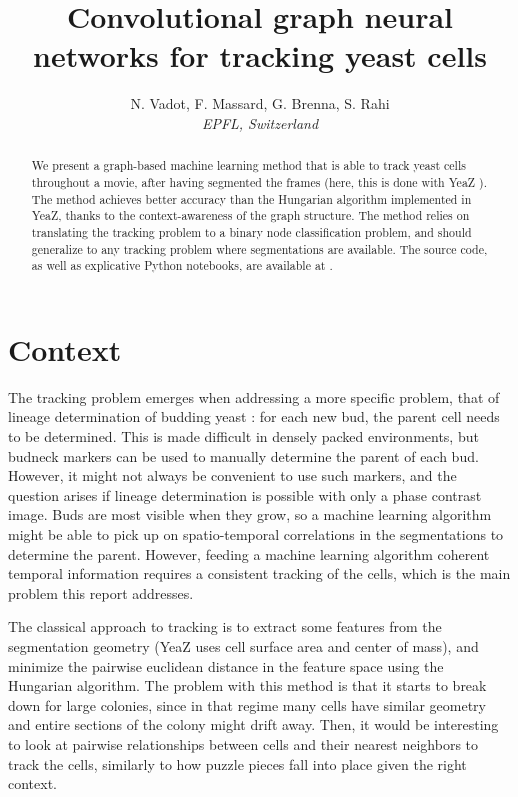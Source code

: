 \documentclass[10pt,conference,compsocconf,a4paper]{IEEEtran}
\begin{document}
\title{Convolutional graph neural networks for tracking yeast cells}

\author{
	N. Vadot, F. Massard, G. Brenna, S. Rahi \\
	\textit{EPFL, Switzerland}
}

\maketitle

\begin{abstract}
	We present a graph-based machine learning method that is able to track yeast cells throughout a movie, after having segmented the frames (here, this is done with YeaZ \cite{dietler_convolutional_2020}). The method achieves better accuracy than the Hungarian algorithm implemented in YeaZ, thanks to the context-awareness of the graph structure. The method relies on translating the tracking problem to a binary node classification problem, and should generalize to any tracking problem where segmentations are available. The source code, as well as explicative Python notebooks, are available at \cite{vadot_cs-433_2021}.
\end{abstract}


\section{Context}

	The tracking problem emerges when addressing a more specific problem, that of lineage determination of budding yeast : for each new bud, the parent cell needs to be determined. This is made difficult in densely packed environments, but budneck markers can be used to manually determine the parent of each bud. However, it might not always be convenient to use such markers, and the question arises if lineage determination is possible with only a phase contrast image. Buds are most visible when they grow, so a machine learning algorithm might be able to pick up on spatio-temporal correlations in the segmentations to determine the parent. However, feeding a machine learning algorithm coherent temporal information requires a consistent tracking of the cells, which is the main problem this report addresses.

	The classical approach to tracking is to extract some features from the segmentation geometry (YeaZ uses cell surface area and center of mass), and minimize the pairwise euclidean distance in the feature space using the Hungarian algorithm. The problem with this method is that it starts to break down for large colonies, since in that regime many cells have similar geometry and entire sections of the colony might drift away. Then, it would be interesting to look at pairwise relationships between cells and their nearest neighbors to track the cells, similarly to how puzzle pieces fall into place given the right context.
\end{document}
